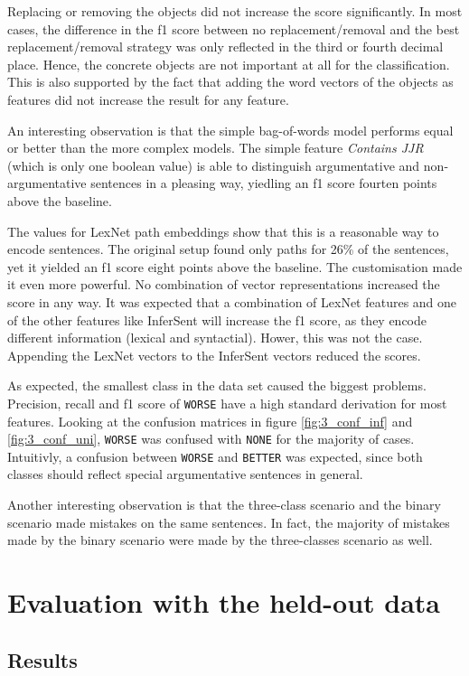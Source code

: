 Replacing or removing the objects did not increase the score significantly. In most cases, the difference in the f1 score between no replacement/removal and the best replacement/removal strategy was only reflected in the third or fourth decimal place. Hence, the concrete objects are not important at all for the classification. This is also supported by the fact that adding the word vectors of the objects as features did not increase the result for any feature.

An interesting observation is that the simple bag-of-words model performs equal or better than the more complex models. The simple feature \emph{Contains JJR} (which is only one boolean value) is able to distinguish argumentative and non-argumentative sentences in a pleasing way, yiedling an f1 score fourten points above the baseline.

The values for LexNet path embeddings show that this is a reasonable way to encode sentences. The original setup found only paths for 26\% of the sentences, yet it yielded an f1 score eight points above the baseline. The customisation made it even more powerful. No combination of vector representations increased the score in any way. It was expected that a combination of LexNet features and one of the other features like InferSent will increase the f1 score, as they encode different information (lexical and syntactial). Hower, this was not the case. Appending the LexNet vectors to the InferSent vectors reduced the scores.

As expected, the smallest class in the data set caused the biggest problems. Precision, recall and f1 score of \texttt{WORSE} have a high standard derivation for most features. Looking at the confusion matrices in figure \ref{fig:3_conf_inf} and \ref{fig:3_conf_uni}, \texttt{WORSE} was confused with \texttt{NONE} for the majority of cases. Intuitivly, a confusion between \texttt{WORSE} and \texttt{BETTER} was expected, since both classes should reflect special argumentative sentences in general.

Another interesting observation is that the three-class scenario and the binary scenario made mistakes on the same sentences. In fact, the majority of mistakes made by the binary scenario were made by the three-classes scenario as well.


\section{Evaluation with the held-out data}
\subsection{Results}
\label{sec:final}

